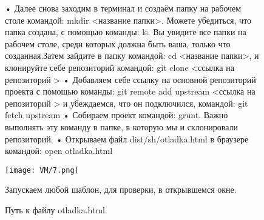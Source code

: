 \begin{figure}
• Далее снова заходим в терминал и создаём папку на рабочем столе командой: mkdir <название папки>. Можете убедиться, что папка создана, с помощью команды: ls. Вы увидите все папки на рабочем столе, среди которых должна быть ваша, только что созданная.Затем зайдите в папку командой: cd <название папки>, и клонируйте себе репозиторий командой: git clone <ссылка на репозиторий >
  \newline   • Добавляем себе ссылку на основной репозиторий проекта с помощью команды: git remote add upstream <ссылка на репозиторий > и убеждаемся, что он подключился, командой: git fetch upstream
   \newline  • Собираем проект командой: grunt. Важно выполнять эту команду в папке, в которую мы и склонировали репозиторий.
  \newline  • Открываем файл dist/sh/otladka.html в браузере командой: open otladka.html


		\texttt{[image: VM/7.png]}
\caption{Путь к файлу otladka.html.}
\label{ris:image}
\quad Запускаем любой шаблон, для проверки, в открывшемся окне.
\end{figure}
